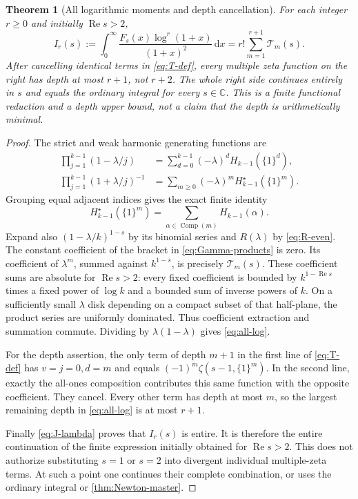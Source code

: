 \documentclass[11pt]{article}
\numberwithin{equation}{section}
\newtheorem{theorem}{Theorem}[section]
\theoremstyle{definition}
\DeclareMathOperator{\Rea}{Re}
\newcommand{\C}{\mathbb C}
\newcommand{\dd}{\,\mathrm d}
\begin{document}
\begin{theorem}[All logarithmic moments and depth cancellation]\label{thm:depth}
For each integer $r\ge0$ and initially $\Rea s>2$,
\begin{equation}\label{eq:all-log}
 \boxed{\displaystyle
 I_r(s):=\int_0^\infty\frac{F_s(x)\log^r(1+x)}{(1+x)^2}\dd x
 =r!\sum_{m=1}^{r+1}\mathcal T_m(s).}
\end{equation}
After cancelling identical terms in \eqref{eq:T-def}, every multiple zeta function on the right has depth at most $r+1$, not $r+2$. The whole right side continues entirely in $s$ and equals the ordinary integral for every $s\in\C$. This is a finite functional reduction and a depth upper bound, not a claim that the depth is arithmetically minimal.
\end{theorem}
\begin{proof}
The strict and weak harmonic generating functions are
\begin{align*}
 \prod_{j=1}^{k-1}(1-\lambda/j)
 &=\sum_{d=0}^{k-1}(-\lambda)^dH_{k-1}(\{1\}^d),\\
 \prod_{j=1}^{k-1}(1+\lambda/j)^{-1}
 &=\sum_{m\ge0}(-\lambda)^mH_{k-1}^\star(\{1\}^m).
\end{align*}
Grouping equal adjacent indices gives the exact finite identity
\[
 H_{k-1}^\star(\{1\}^m)=
 \sum_{\alpha\in\operatorname{Comp}(m)}H_{k-1}(\alpha).
\]
Expand also $(1-\lambda/k)^{1-s}$ by its binomial series and $R(\lambda)$ by \eqref{eq:R-even}. The constant coefficient of the bracket in \eqref{eq:Gamma-products} is zero. Its coefficient of $\lambda^m$, summed against $k^{1-s}$, is precisely $\mathcal T_m(s)$. These coefficient sums are absolute for $\Rea s>2$: every fixed coefficient is bounded by $k^{1-\Rea s}$ times a fixed power of $\log k$ and a bounded sum of inverse powers of $k$. On a sufficiently small $\lambda$ disk depending on a compact subset of that half-plane, the product series are uniformly dominated. Thus coefficient extraction and summation commute. Dividing by $\lambda(1-\lambda)$ gives \eqref{eq:all-log}.

For the depth assertion, the only term of depth $m+1$ in the first line of \eqref{eq:T-def} has $v=j=0,d=m$ and equals $(-1)^m\zeta(s-1,\{1\}^m)$. In the second line, exactly the all-ones composition contributes this same function with the opposite coefficient. They cancel. Every other term has depth at most $m$, so the largest remaining depth in \eqref{eq:all-log} is at most $r+1$.

Finally \eqref{eq:J-lambda} proves that $I_r(s)$ is entire. It is therefore the entire continuation of the finite expression initially obtained for $\Rea s>2$. This does not authorize substituting $s=1$ or $s=2$ into divergent individual multiple-zeta terms. At such a point one continues their complete combination, or uses the ordinary integral or \cref{thm:Newton-master}.
\end{proof}
\end{document}
